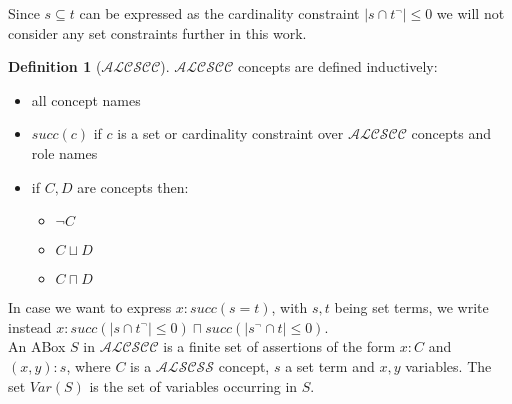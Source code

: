 \documentclass[a4paper,11pt]{scrartcl}
\theoremstyle{break}
\theoremstyle{definition}
\newtheorem{mydef}{Definition}
\begin{document}
Since $s\subseteq t$ can be expressed as the cardinality constraint $|s\cap t^\neg|\leq 0$ we will not consider any set constraints further in this work.
\begin{mydef}[$\mathcal{ALCSCC}$]
$\mathcal{ALCSCC}$ concepts are defined inductively:
\begin{itemize}
\item all concept names
\item $succ(c)$ if $c$ is a set or cardinality constraint over $\mathcal{ALCSCC}$ concepts and role names
\item if $C,D$ are concepts then:
\begin{itemize}
\item $\neg C$
\item $C\sqcup D$
\item $C\sqcap D$
\end{itemize}
\end{itemize}
\end{mydef}
In case we want to express $x:succ(s=t)$, with $s,t$ being set terms, we write instead $x:succ(|s\cap t^\neg|\leq 0)\sqcap succ(|s^\neg\cap t|\leq 0)$.\\
An ABox $S$ in $\mathcal{ALCSCC}$ is a finite set of assertions of the form $x:C$ and $(x,y):s$, where $C$ is a $\mathcal{ALSCSS}$ concept, $s$ a set term and $x,y$ variables. The set $Var(S)$ is the set of variables occurring in $S$.
\end{document}
